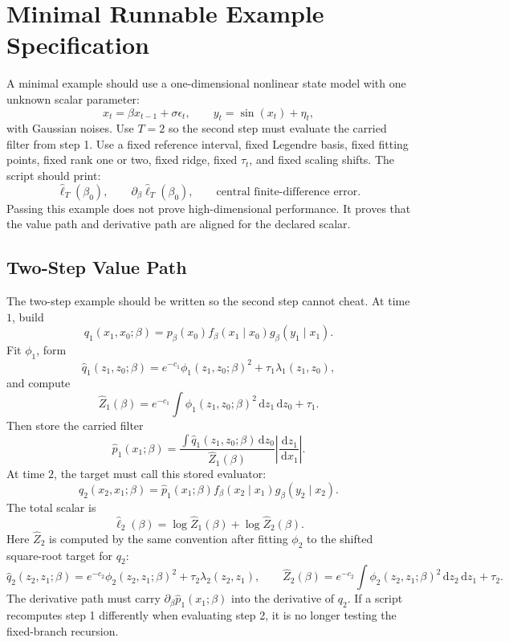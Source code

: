 \documentclass[11pt]{article}
\newcommand{\dd}{\,\mathrm d}
\begin{document}
\section{Minimal Runnable Example Specification}

A minimal example should use a one-dimensional nonlinear state model with one
unknown scalar parameter:
\[
    x_t=\beta x_{t-1}+\sigma\epsilon_t,\qquad
    y_t=\sin(x_t)+\eta_t,
\]
with Gaussian noises.  Use \(T=2\) so the second step must evaluate the carried
filter from step 1.  Use a fixed reference interval, fixed Legendre basis,
fixed fitting points, fixed rank one or two, fixed ridge, fixed \(\tau_t\), and
fixed scaling shifts.  The script should print:
\[
    \widehat\ell_T(\beta_0),\qquad
    \partial_\beta\widehat\ell_T(\beta_0),\qquad
    \text{central finite-difference error}.
\]
Passing this example does not prove high-dimensional performance.  It proves
that the value path and derivative path are aligned for the declared scalar.

\subsection{Two-Step Value Path}

The two-step example should be written so the second step cannot cheat.  At
time \(1\), build
\[
    q_1(x_1,x_0;\beta)
    =
    p_\beta(x_0)f_\beta(x_1\mid x_0)g_\beta(y_1\mid x_1).
\]
Fit \(\phi_1\), form
\[
    \widehat q_1(z_1,z_0;\beta)
    =
    e^{-c_1}\phi_1(z_1,z_0;\beta)^2+\tau_1\lambda_1(z_1,z_0),
\]
and compute
\[
    \widehat Z_1(\beta)
    =
    e^{-c_1}\int \phi_1(z_1,z_0;\beta)^2\dd z_1\dd z_0+\tau_1.
\]
Then store the carried filter
\[
    \widehat p_1(x_1;\beta)
    =
    \frac{\int \widehat q_1(z_1,z_0;\beta)\dd z_0}
    {\widehat Z_1(\beta)}
    \left|\frac{\dd z_1}{\dd x_1}\right|.
\]
At time \(2\), the target must call this stored evaluator:
\[
    q_2(x_2,x_1;\beta)
    =
    \widehat p_1(x_1;\beta)
    f_\beta(x_2\mid x_1)g_\beta(y_2\mid x_2).
\]
The total scalar is
\[
    \widehat\ell_2(\beta)
    =
    \log\widehat Z_1(\beta)+\log\widehat Z_2(\beta).
\]
Here \(\widehat Z_2\) is computed by the same convention after fitting
\(\phi_2\) to the shifted square-root target for \(q_2\):
\[
    \widehat q_2(z_2,z_1;\beta)
    =
    e^{-c_2}\phi_2(z_2,z_1;\beta)^2+\tau_2\lambda_2(z_2,z_1),
    \qquad
    \widehat Z_2(\beta)
    =
    e^{-c_2}\int \phi_2(z_2,z_1;\beta)^2\dd z_2\dd z_1+\tau_2 .
\]
The derivative path must carry
\(\partial_\beta\widehat p_1(x_1;\beta)\) into the derivative of \(q_2\).
If a script recomputes step 1 differently when evaluating step 2, it is no
longer testing the fixed-branch recursion.
\end{document}
